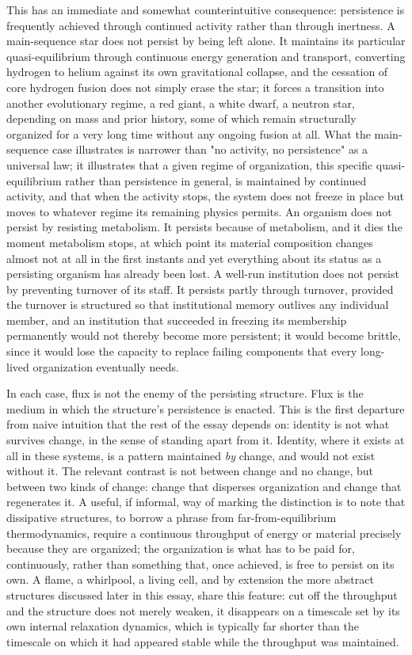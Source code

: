\documentclass[11pt]{article}
\begin{document}
This has an immediate and somewhat counterintuitive consequence: persistence is frequently achieved through continued activity rather than through inertness. A main-sequence star does not persist by being left alone. It maintains its particular quasi-equilibrium through continuous energy generation and transport, converting hydrogen to helium against its own gravitational collapse, and the cessation of core hydrogen fusion does not simply erase the star; it forces a transition into another evolutionary regime, a red giant, a white dwarf, a neutron star, depending on mass and prior history, some of which remain structurally organized for a very long time without any ongoing fusion at all. What the main-sequence case illustrates is narrower than "no activity, no persistence" as a universal law; it illustrates that a given regime of organization, this specific quasi-equilibrium rather than persistence in general, is maintained by continued activity, and that when the activity stops, the system does not freeze in place but moves to whatever regime its remaining physics permits. An organism does not persist by resisting metabolism. It persists because of metabolism, and it dies the moment metabolism stops, at which point its material composition changes almost not at all in the first instants and yet everything about its status as a persisting organism has already been lost. A well-run institution does not persist by preventing turnover of its staff. It persists partly through turnover, provided the turnover is structured so that institutional memory outlives any individual member, and an institution that succeeded in freezing its membership permanently would not thereby become more persistent; it would become brittle, since it would lose the capacity to replace failing components that every long-lived organization eventually needs.

In each case, flux is not the enemy of the persisting structure. Flux is the medium in which the structure's persistence is enacted. This is the first departure from naive intuition that the rest of the essay depends on: identity is not what survives change, in the sense of standing apart from it. Identity, where it exists at all in these systems, is a pattern maintained \emph{by} change, and would not exist without it. The relevant contrast is not between change and no change, but between two kinds of change: change that disperses organization and change that regenerates it. A useful, if informal, way of marking the distinction is to note that dissipative structures, to borrow a phrase from far-from-equilibrium thermodynamics, require a continuous throughput of energy or material precisely because they are organized; the organization is what has to be paid for, continuously, rather than something that, once achieved, is free to persist on its own. A flame, a whirlpool, a living cell, and by extension the more abstract structures discussed later in this essay, share this feature: cut off the throughput and the structure does not merely weaken, it disappears on a timescale set by its own internal relaxation dynamics, which is typically far shorter than the timescale on which it had appeared stable while the throughput was maintained.
\end{document}

